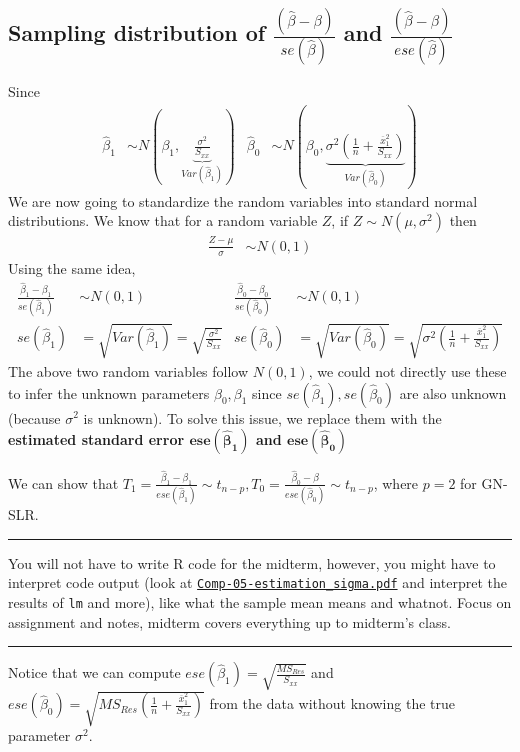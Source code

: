 \documentclass[12 pt]{article}
\begin{document}
    \subsection{Sampling distribution of $\frac{(\hat{\beta} -
        \beta)}{se(\hat{\beta})}$ and $\frac{(\hat{\beta} -
        \beta)}{ese(\hat{\beta})}$}
    Since
    \begin{align*}
      \hat{\beta}_1 & \sim N \left(\beta_1, \underbrace{\frac{\sigma^2}{S_{xx}}}_{Var(\hat{\beta}_1)}\right) & \hat{\beta}_0 & \sim N \left(\beta_0, \underbrace{\sigma^2 \left(\frac{1}{n} + \frac{\overline{x}_1^2}{S_{xx}}\right)}_{Var(\hat{\beta}_0)}\right)
    \end{align*}
    We are now going to standardize the random variables into standard
    normal distributions. We know
    that for a random variable $Z$, if $Z \sim N(\mu, \sigma^2)$ then
    \begin{align*}
      \frac{Z - \mu}{\sigma} & \sim N(0,1)
    \end{align*}
    Using the same idea,
    \begin{align*}
      \frac{\hat{\beta}_1 - \beta_1}{se(\hat{\beta}_1)} & \sim N(0,1) & \frac{\hat{\beta}_0 - \beta_0}{se(\hat{\beta}_0)} & \sim N(0,1)
      \\ se(\hat{\beta}_1) & = \sqrt{Var(\hat{\beta}_1)} = \sqrt{\frac{\sigma^2}{S_{xx}}} & se(\hat{\beta}_0) & = \sqrt{Var(\hat{\beta}_0)} = \sqrt{\sigma^2 \left(\frac{1}{n} + \frac{\overline{x}_1^2}{S_{xx}}\right)}
    \end{align*}
    The above two random variables follow $N(0,1)$, we could not
    directly use these to infer the unknown parameters $\beta_0,
    \beta_1$ since $se(\hat{\beta}_1), se(\hat{\beta}_0)$ are also
    unknown (because $\sigma^2$ is unknown). To solve this issue, we
    replace them with the \textbf{estimated standard error
      $\mathbf{ese(\hat{\beta}_1)}$ and $\mathbf{ese(\hat{\beta}_0)}$}

    We can show that $T_1 = \frac{\hat{\beta}_1 -
      \beta_1}{ese(\hat{\beta}_1)} \sim t_{n-p}, T_0 =
    \frac{\hat{\beta}_0 - \beta}{ese(\hat{\beta}_0)} \sim t_{n-p}$,
    where $p = 2$ for GN-SLR.
    \\ \noindent \rule{\textwidth}{0.5pt}
    You will not have to write R code for the midterm, however, you
    might have to interpret code output (look at
    \href{http://www.math.mcgill.ca/yyang/regression/comp/Comp-05-estimation_sigma.pdf}{\texttt{Comp-05-estimation\_sigma.pdf}}
    and interpret the results of \texttt{lm} and more), like what the sample mean
    means and whatnot. Focus on assignment and notes, midterm covers
    everything up to midterm's class.
    \\ \noindent \rule{\textwidth}{0.5pt}
    Notice that we can compute $ese(\hat{\beta}_1) =
    \sqrt{\frac{MS_{Res}}{S_{xx}}}$ and $ese(\hat{\beta}_0) =
    \sqrt{MS_{Res} \left(\frac{1}{n} +
        \frac{\overline{x}_1^2}{S_{xx}}\right)}$ from the data without
    knowing the true parameter $\sigma^2$.
\end{document}
